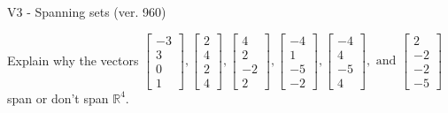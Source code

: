 \begin{exercise}
  \begin{exerciseTitle}V3 - Spanning sets (ver. 960)\end{exerciseTitle}
  \begin{exerciseStatement}
    Explain why the vectors \(\left[\begin{array}{r}
-3 \\
3 \\
0 \\
1
\end{array}\right] , \left[\begin{array}{r}
2 \\
4 \\
2 \\
4
\end{array}\right] , \left[\begin{array}{r}
4 \\
2 \\
-2 \\
2
\end{array}\right] , \left[\begin{array}{r}
-4 \\
1 \\
-5 \\
-2
\end{array}\right] , \left[\begin{array}{r}
-4 \\
4 \\
-5 \\
4
\end{array}\right] , \text{ and } \left[\begin{array}{r}
2 \\
-2 \\
-2 \\
-5
\end{array}\right]\) span or don't span \(\mathbb{R}^4\). 
	



\end{exerciseStatement}
\end{exercise}
